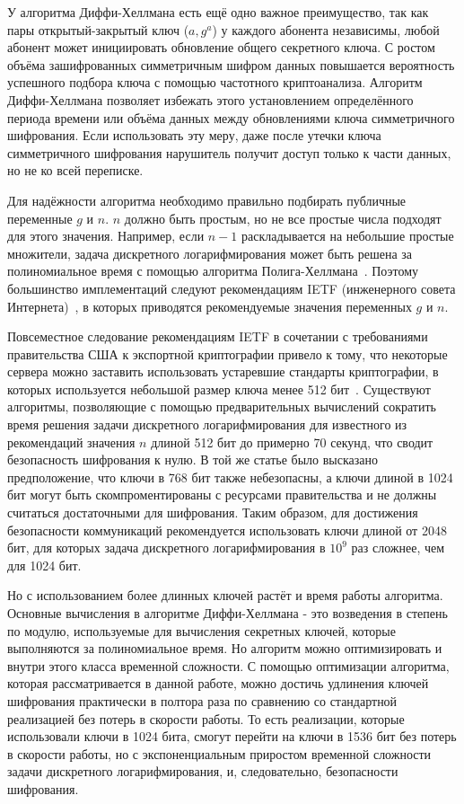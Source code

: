 \documentclass[times,specification,annotation]{itmo-student-thesis}
\begin{document}
У алгоритма Диффи-Хеллмана есть ещё одно важное преимущество, так как пары открытый-закрытый ключ ($a, g^a$) у каждого абонента независимы, любой абонент может инициировать
обновление общего секретного ключа.
С ростом объёма зашифрованных симметричным шифром данных повышается вероятность успешного подбора ключа с помощью
частотного криптоанализа.
Алгоритм Диффи-Хеллмана позволяет избежать этого установлением определённого периода времени или объёма данных
между обновлениями ключа симметричного шифрования.
Если использовать эту меру, даже после утечки ключа симметричного шифрования нарушитель получит доступ только к части
данных, но не ко всей переписке.

Для надёжности алгоритма необходимо правильно подбирать публичные переменные $g$ и $n$.
$n$ должно быть простым, но не все простые числа подходят для этого значения.
Например, если $n-1$ раскладывается на небольшие простые множители, задача дискретного логарифмирования
может быть решена за полиномиальное время с помощью алгоритма Полига-Хеллмана~\cite{men01}.
Поэтому большинство имплементаций следуют рекомендациям IETF (инженерного совета Интернета)~\cite{rfc7296}, в которых
приводятся рекомендуемые значения переменных $g$ и $n$.

Повсеместное следование рекомендациям IETF в сочетании с требованиями правительства США к экспортной криптографии
привело к тому, что некоторые сервера можно заставить использовать устаревшие стандарты криптографии, в которых
используется небольшой размер ключа менее 512 бит~\cite{adr15}.
Существуют алгоритмы, позволяющие с помощью предварительных вычислений сократить время решения задачи
дискретного логарифмирования для известного из рекомендаций значения $n$ длиной 512 бит до примерно 70 секунд, что сводит
безопасность шифрования к нулю.
В той же статье было высказано предположение, что ключи в 768 бит также небезопасны, а ключи длиной
в 1024 бит могут быть скомпроментированы с ресурсами правительства и не должны считаться достаточными для шифрования.
Таким образом, для достижения безопасности коммуникаций рекомендуется использовать ключи длиной от 2048 бит,
для которых задача дискретного логарифмирования в $10^9$ раз сложнее, чем для 1024 бит.

Но с использованием более длинных ключей растёт и время работы алгоритма.
Основные вычисления в алгоритме Диффи-Хеллмана - это возведения в степень по модулю, используемые для вычисления секретных ключей,
которые выполняются за полиномиальное время.
Но алгоритм можно оптимизировать и внутри этого класса временной сложности.
С помощью оптимизации алгоритма, которая рассматривается в данной работе, можно достичь удлинения ключей шифрования
практически в полтора раза по сравнению со стандартной реализацией без потерь в скорости работы.
То есть реализации, которые использовали ключи в 1024 бита, смогут перейти на ключи в 1536 бит без потерь в скорости работы,
но с экспоненциальным приростом временной сложности задачи дискретного логарифмирования, и, следовательно, безопасности
шифрования.
\end{document}
